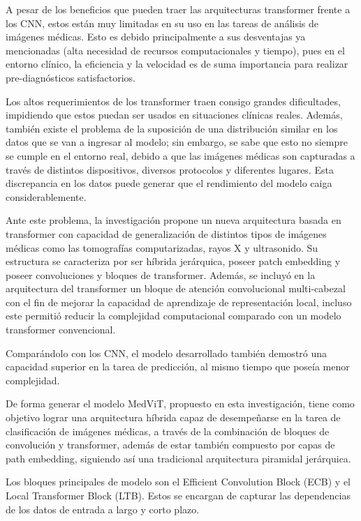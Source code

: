A pesar de los beneficios que pueden traer las arquitecturas transformer frente a los CNN, estos están muy limitadas en su uso en las tareas de análisis de imágenes médicas. Esto es debido principalmente a sus desventajas ya mencionadas (alta necesidad de recursos computacionales y tiempo), pues en el entorno clínico, la eficiencia y la velocidad es de suma importancia para realizar pre-diagnósticos satisfactorios.

Los altos requerimientos de los transformer traen consigo grandes dificultades, impidiendo que estos puedan ser usados en situaciones clínicas reales. Además, también existe el problema de la suposición de una distribución similar en los datos que se van a ingresar al modelo; sin embargo, se sabe que esto no siempre se cumple en el entorno real, debido a que las imágenes médicas son capturadas a través de distintos dispositivos, diversos protocolos y diferentes lugares. Esta discrepancia en los datos puede generar que el rendimiento del modelo caiga considerablemente.

Ante este problema, la investigación propone un nueva arquitectura basada en transformer con capacidad de generalización de distintos tipos de imágenes médicas como las tomografías computarizadas, rayos X y ultrasonido. Su estructura se caracteriza por ser híbrida jerárquica, poseer patch embedding y poseer convoluciones y bloques de transformer. Además, se incluyó en la arquitectura del transformer un bloque de atención convolucional multi-cabezal con el fin de mejorar la capacidad de aprendizaje de representación local, incluso este permitió reducir la complejidad computacional comparado con un modelo transformer convencional.

Comparándolo con los CNN, el modelo desarrollado también demostró una capacidad superior en la tarea de predicción, al mismo tiempo que poseía menor complejidad.

De forma generar el modelo MedViT, propuesto en esta investigación, tiene como objetivo lograr una arquitectura híbrida capaz de desempeñarse en la tarea de clasificación de imágenes médicas, a través de la combinación de bloques de convolución y transformer, además de estar también compuesto por capas de path embedding, siguiendo así una tradicional arquitectura piramidal jerárquica.

Los bloques principales de modelo son el Efficient Convolution Block (ECB) y el Local Transformer Block (LTB). Estos se encargan de capturar las dependencias de los datos de entrada a largo y corto plazo.


